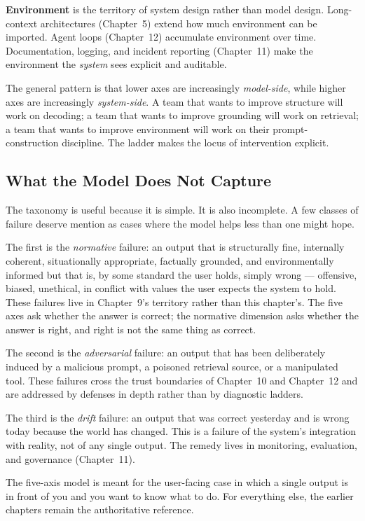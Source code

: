 \textbf{Environment} is the territory of system design rather than
model design. Long-context architectures (Chapter~5) extend how
much environment can be imported. Agent loops (Chapter~12)
accumulate environment over time. Documentation, logging, and
incident reporting (Chapter~11) make the environment the
\emph{system} sees explicit and auditable.

The general pattern is that lower axes are increasingly
\emph{model-side}, while higher axes are increasingly
\emph{system-side}. A team that wants to improve structure will
work on decoding; a team that wants to improve grounding will
work on retrieval; a team that wants to improve environment will
work on their prompt-construction discipline. The ladder makes the
locus of intervention explicit.

\subsection{What the Model Does Not Capture}

The taxonomy is useful because it is simple. It is also incomplete.
A few classes of failure deserve mention as cases where the model
helps less than one might hope.

The first is the \emph{normative} failure: an output that is
structurally fine, internally coherent, situationally appropriate,
factually grounded, and environmentally informed but that is, by
some standard the user holds, simply wrong --- offensive, biased,
unethical, in conflict with values the user expects the system to
hold. These failures live in Chapter~9's territory rather than
this chapter's. The five axes ask whether the answer is correct;
the normative dimension asks whether the answer is right, and
right is not the same thing as correct.

The second is the \emph{adversarial} failure: an output that has
been deliberately induced by a malicious prompt, a poisoned
retrieval source, or a manipulated tool. These failures cross the
trust boundaries of Chapter~10 and Chapter~12 and are addressed by
defenses in depth rather than by diagnostic ladders.

The third is the \emph{drift} failure: an output that was correct
yesterday and is wrong today because the world has changed. This
is a failure of the system's integration with reality, not of any
single output. The remedy lives in monitoring, evaluation, and
governance (Chapter~11).

The five-axis model is meant for the user-facing case in which a
single output is in front of you and you want to know what to do.
For everything else, the earlier chapters remain the authoritative
reference.

